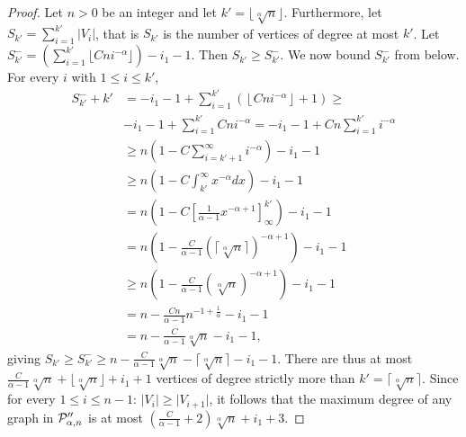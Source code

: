 \begin{proof}
Let $n > 0$ be an integer and let $k' = \lfloor \sqrt[\alpha]{n} \rfloor$. 
Furthermore, let $S_{k'} = \sum_{i=1}^{k'} \vert V_i\vert$, that is $S_{k'}$ is the number of vertices of degree at most $k'$. Let $S^{-}_{k'} = (\sum_{i=1}^{k'} \lfloor Cni^{-\alpha}\rfloor) - i_1 - 1$. Then
$S_{k'} \geq S^{-}_{k'}$. We now bound $S^{-}_{k'}$ from below.
For every $i$ with $1 \leq i \leq k'$,
\begin{align*}
S^{-}_{k'} + k' & = -i_1 - 1 + \sum_{i=1}^{k'} \left(\left\lfloor Cn i^{-\alpha}\right\rfloor + 1\right) \geq \\ 
 &-i_1 - 1 + \sum_{i=1}^{k'} Cn i^{- \alpha}  = -i_1 - 1 + Cn \sum_{i=1}^{k'} i^{-\alpha} \\
    & \geq n \left(1 - C\sum_{i=k'+1}^{\infty} i^{-\alpha} \right) - i_1 - 1 \\
    & \geq n \left( 1 - C\int_{k'}^\infty x^{-\alpha} dx \right) - i_1 - 1\\
 & = n \left( 1 - C\left[ \frac{1}{\alpha - 1} x^{-\alpha + 1}\right]_{\infty}^{k'}\right) - i_1 - 1 \\
 & = n \left( 1 - \frac{C}{\alpha - 1} \left( \lceil\sqrt[\alpha]{n} \rceil \right)^{-\alpha + 1}\right) - i_1 - 1\\
 & \geq n \left( 1 -  \frac{C}{\alpha - 1} \left(\sqrt[\alpha]{n}\right)^{-\alpha + 1} \right) - i_1 - 1 \\
 & = n - \frac{Cn}{\alpha - 1}n^{-1+\frac{1}{\alpha}} - i_1 - 1\\
 & = n - \frac{C}{\alpha - 1}\sqrt[\alpha]{n} - i_1 - 1,
\end{align*}
giving $S_{k'} \geq S^{-}_{k'} \geq n - \frac{C}{\alpha - 1}\sqrt[\alpha]{n} - \lceil \sqrt[\alpha]{n} \rceil - i_1 - 1$. There are thus at most $\frac{C}{\alpha - 1} \sqrt[\alpha]{n} + \lfloor \sqrt[\alpha]{n} \rfloor + i_1 + 1$ vertices of degree strictly more than $k' = \lceil \sqrt[\alpha]{n} \rceil$. Since for every $1 \leq i \leq n-1$: $\vert V_i \vert \geq \vert V_{i+1} \vert$, it follows that the maximum degree of any graph in $ \mathcal{P}''_{\alpha,n}$ is at most $\left(\frac{C}{\alpha - 1} + 2\right) \sqrt[\alpha]{n} + i_1 + 3$.
\end{proof}

